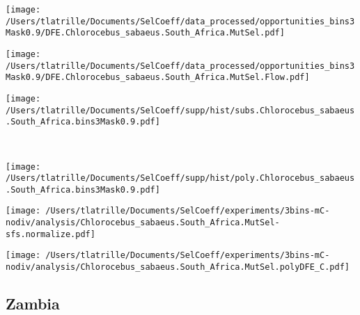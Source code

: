 \documentclass{article}
\begin{document}
    \begin{minipage}{0.32\linewidth}
        \texttt{[image: /Users/tlatrille/Documents/SelCoeff/data\_processed/opportunities\_bins3Mask0.9/DFE.Chlorocebus\_sabaeus.South\_Africa.MutSel.pdf]}
    \end{minipage}
    \begin{minipage}{0.32\linewidth}
        \texttt{[image: /Users/tlatrille/Documents/SelCoeff/data\_processed/opportunities\_bins3Mask0.9/DFE.Chlorocebus\_sabaeus.South\_Africa.MutSel.Flow.pdf]}
    \end{minipage}
    \begin{minipage}{0.32\linewidth}
        \texttt{[image: /Users/tlatrille/Documents/SelCoeff/supp/hist/subs.Chlorocebus\_sabaeus.South\_Africa.bins3Mask0.9.pdf]}
    \end{minipage}
    \\
    \begin{minipage}{0.32\linewidth}
        \texttt{[image: /Users/tlatrille/Documents/SelCoeff/supp/hist/poly.Chlorocebus\_sabaeus.South\_Africa.bins3Mask0.9.pdf]}
    \end{minipage}
    \begin{minipage}{0.32\linewidth}
        \texttt{[image: /Users/tlatrille/Documents/SelCoeff/experiments/3bins-mC-nodiv/analysis/Chlorocebus\_sabaeus.South\_Africa.MutSel-sfs.normalize.pdf]}
    \end{minipage}
    \begin{minipage}{0.32\linewidth}
        \texttt{[image: /Users/tlatrille/Documents/SelCoeff/experiments/3bins-mC-nodiv/analysis/Chlorocebus\_sabaeus.South\_Africa.MutSel.polyDFE\_C.pdf]}
    \end{minipage}
    \subsection{Zambia}
\end{document}
